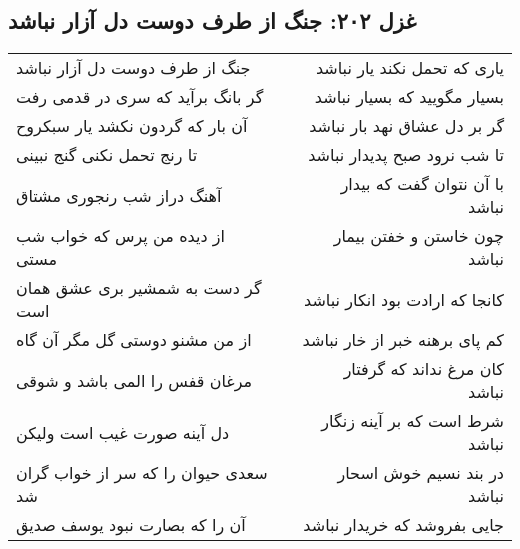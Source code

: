 \begin{center}
\section*{غزل ۲۰۲: جنگ از طرف دوست دل آزار نباشد}
\label{sec:202}
\begin{longtable}{l p{0.5cm} r}
جنگ از طرف دوست دل آزار نباشد
&&
یاری که تحمل نکند یار نباشد
\\
گر بانگ برآید که سری در قدمی رفت
&&
بسیار مگویید که بسیار نباشد
\\
آن بار که گردون نکشد یار سبکروح
&&
گر بر دل عشاق نهد بار نباشد
\\
تا رنج تحمل نکنی گنج نبینی
&&
تا شب نرود صبح پدیدار نباشد
\\
آهنگ دراز شب رنجوری مشتاق
&&
با آن نتوان گفت که بیدار نباشد
\\
از دیده من پرس که خواب شب مستی
&&
چون خاستن و خفتن بیمار نباشد
\\
گر دست به شمشیر بری عشق همان است
&&
کانجا که ارادت بود انکار نباشد
\\
از من مشنو دوستی گل مگر آن گاه
&&
کم پای برهنه خبر از خار نباشد
\\
مرغان قفس را المی باشد و شوقی
&&
کان مرغ نداند که گرفتار نباشد
\\
دل آینه صورت غیب است ولیکن
&&
شرط است که بر آینه زنگار نباشد
\\
سعدی حیوان را که سر از خواب گران شد
&&
در بند نسیم خوش اسحار نباشد
\\
آن را که بصارت نبود یوسف صدیق
&&
جایی بفروشد که خریدار نباشد
\\
\end{longtable}
\end{center}
